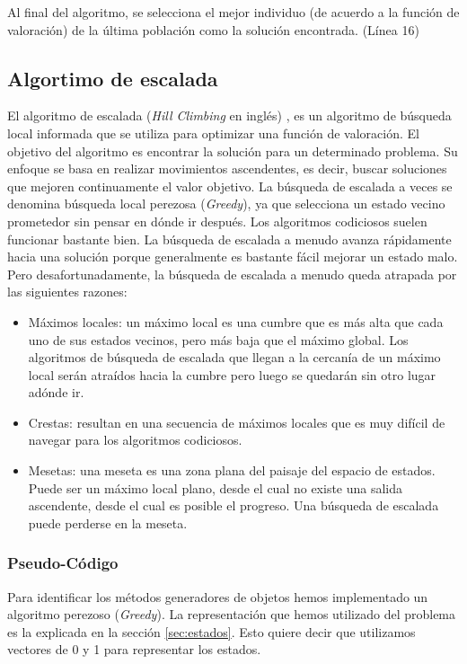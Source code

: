 Al final del algoritmo, se selecciona el mejor individuo (de acuerdo a la función de valoración) de la última población como la solución encontrada. (Línea 16)


\subsection{Algortimo de escalada}
\label{alg:approachHC}
El algoritmo de escalada (\emph{Hill Climbing} en inglés) \cite{Russell:2009, Cormen2009, kleinberg2006}, es un algoritmo de búsqueda local informada que se utiliza para optimizar una función de valoración. El objetivo del algoritmo es encontrar la solución para un  determinado problema.  Su enfoque se basa en realizar movimientos ascendentes, es decir, buscar soluciones que mejoren continuamente el valor objetivo. La búsqueda de escalada a veces se denomina búsqueda local perezosa (\emph{Greedy}), ya que selecciona un estado vecino prometedor sin pensar en dónde ir después. Los algoritmos codiciosos suelen funcionar bastante bien. La búsqueda de escalada a menudo avanza rápidamente hacia una solución porque generalmente es bastante fácil mejorar un estado malo.
Pero desafortunadamente, la búsqueda de escalada a menudo queda atrapada por las siguientes razones:
\begin{itemize}
\item Máximos locales: un máximo local es una cumbre que es más alta que cada uno de sus estados vecinos, pero más baja que el máximo global. Los algoritmos de búsqueda de escalada que llegan a la cercanía de un máximo local serán atraídos hacia la cumbre pero luego se quedarán sin otro lugar adónde ir. 
\item Crestas: resultan en una secuencia de máximos locales que es muy difícil de navegar para los algoritmos codiciosos.

\item Mesetas: una meseta es una zona plana del paisaje del espacio de estados. Puede ser un máximo local plano, desde el cual no existe una salida ascendente, desde el cual es posible el progreso. Una búsqueda de escalada puede perderse en la meseta.
\end{itemize}

\subsubsection{Pseudo-Código}
Para identificar los métodos generadores de objetos hemos implementado un algoritmo perezoso (\emph{Greedy}). 
La representación que hemos utilizado del problema es la explicada en la sección \ref{sec:estados}. Esto quiere decir que utilizamos vectores de 0 y 1 para representar los estados. 


